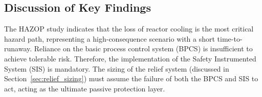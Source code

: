 \subsection{Discussion of Key Findings}
The HAZOP study indicates that the loss of reactor cooling is the most critical hazard path, representing a high-consequence scenario with a short time-to-runaway. Reliance on the basic process control system (BPCS) is insufficient to achieve tolerable risk. Therefore, the implementation of the Safety Instrumented System (SIS) is mandatory. The sizing of the relief system (discussed in Section~\ref{sec:relief_sizing}) must assume the failure of both the BPCS and SIS to act, acting as the ultimate passive protection layer.
